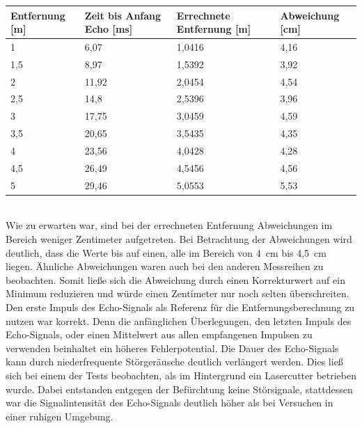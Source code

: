 \begin{minipage}{1\textwidth}
\begin{tabularx}{\textwidth}{|p{}|p{}|p{}|X|}
\hline
Entfernung [m]& Zeit bis Anfang Echo [ms]  & Errechnete Entfernung [m] & Abweichung [cm]\\
\hline
1 & 6,07 & 1,0416 & 4,16\\
\hline
1,5 & 8,97 & 1,5392 & 3,92\\
\hline
2 & 11,92 & 2,0454 & 4,54\\
\hline
2,5 & 14,8 & 2,5396 & 3,96\\
\hline
3 & 17,75 & 3,0459 & 4,59\\
\hline
3,5 & 20,65 & 3,5435 & 4,35\\
\hline
4 & 23,56 & 4,0428 & 4,28\\
\hline
4,5 & 26,49 & 4,5456 & 4,56\\
\hline
5 & 29,46 & 5,0553 & 5,53\\
\hline
\end{tabularx}

\label{tab:Entfernungsmessung}
\end{minipage}\\


Wie zu erwarten war, sind bei der errechneten Entfernung Abweichungen im Bereich weniger Zentimeter aufgetreten. Bei Betrachtung der Abweichungen wird deutlich, dass die Werte bis auf einen, alle im Bereich von 4~cm bis 4,5~cm liegen. Ähnliche Abweichungen waren auch bei den anderen Messreihen zu beobachten. Somit ließe sich die Abweichung durch einen Korrekturwert auf ein Minimum reduzieren und würde einen Zentimeter nur noch selten überschreiten. Den erste Impuls des Echo-Signals als Referenz für die Entfernungsberechnung zu nutzen war korrekt. Denn die anfänglichen Überlegungen, den letzten Impuls des Echo-Signals, oder einen Mittelwert aus allen empfangenen Impulsen zu verwenden beinhaltet ein höheres Fehlerpotential. Die Dauer des Echo-Signals kann durch niederfrequente Störgeräusche deutlich verlängert werden. Dies ließ sich bei einem der Tests beobachten, als im Hintergrund ein Lasercutter betrieben wurde. Dabei entstanden entgegen der Befürchtung keine Störsignale, stattdessen war die Signalintensität des Echo-Signals deutlich höher als bei Versuchen in einer ruhigen Umgebung. 












